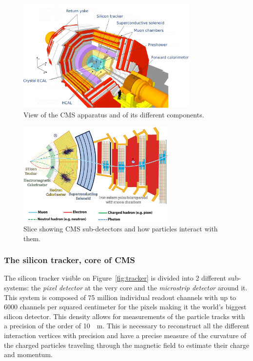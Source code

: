 	\begin{figure}[H]
		\centering
		\includegraphics[width=0.8\textwidth]{fig/chapt2/CMS_detail.pdf}
		\caption{\label{fig:CMS-detail} View of the CMS apparatus and of its different components.}
	\end{figure}
	
	\begin{figure}[H]
		\centering
		\includegraphics[width=0.7\textwidth]{fig/chapt2/CMS_slice.png}
		\caption{\label{fig:CMS-slice} Slice showing CMS sub-detectors and how particles interact with them.}
	\end{figure}
	
		\subsubsection{The silicon tracker, core of CMS}
		\label{chapt2:sssec:tracker}
	
	The silicon tracker visible on Figure~\ref{fig:tracker} is divided into 2 different sub-systems: the \textit{pixel detector} at the very core and the \textit{microstrip detector} around it. This system is composed of 75 million individual readout channels with up to 6000 channels per squared centimeter for the pixels making it the world's biggest silicon detector. This density allows for measurements of the particle tracks with a precision of the order of \SI{10}{\mu m}. This is necessary to reconstruct all the different interaction vertices with precision and have a precise measure of the curvature of the charged particles traveling through the magnetic field to estimate their charge and momentum.
	
